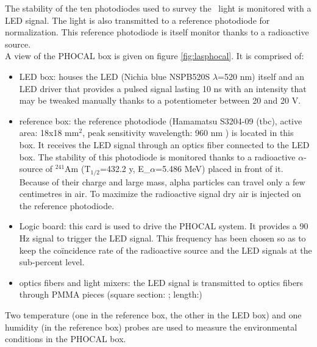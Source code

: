 The stability of the ten photodiodes used to survey the \laser~light is monitored with a LED signal. The light is also transmitted to a reference photodiode for normalization. This reference photodiode is itself monitor thanks to a radioactive source.\\
A view of the PHOCAL box is given on figure \ref{fig:lasphocal}. It is comprised of:
\begin{itemize}
\item LED box: houses the LED (Nichia blue NSPB520S $\lambda$=520 nm) itself and an LED driver that provides a pulsed signal lasting 10 ns with an intensity that may be tweaked manually thanks to a potentiometer between 20 and 20 V.
\item reference box: the reference photodiode (Hamamatsu S3204-09 (tbc), active area: 18x18 mm$^2$, peak sensitivity wavelength: 960 nm ) is located in this box. It receives the LED signal through an optics fiber connected to the LED box. The stability of this photodiode is monitored thanks to a radioactive $\alpha$-source of $^{241}$Am (T$_{1/2}$=432.2 y, E_${\alpha}$=5.486 MeV) placed in front of it. Because of their charge and large mass, alpha particles can travel only a few centimetres in air. To maximize the radioactive signal dry air is injected on the reference photodiode.
\item Logic board: this card is used to drive the PHOCAL system. It provides a 90 Hz signal to trigger the LED signal. This frequency has been chosen so as to keep the coïncidence rate of the radioactive source and the LED signals at the sub-percent level.
\item optics fibers and light mixers: the LED signal is transmitted to optics fibers through PMMA pieces (square section: ; length:) 
\end{itemize}
Two temperature (one in the reference box, the other in the LED box) and one humidity (in the reference box) probes are used to measure the environmental conditions in the PHOCAL box. 


